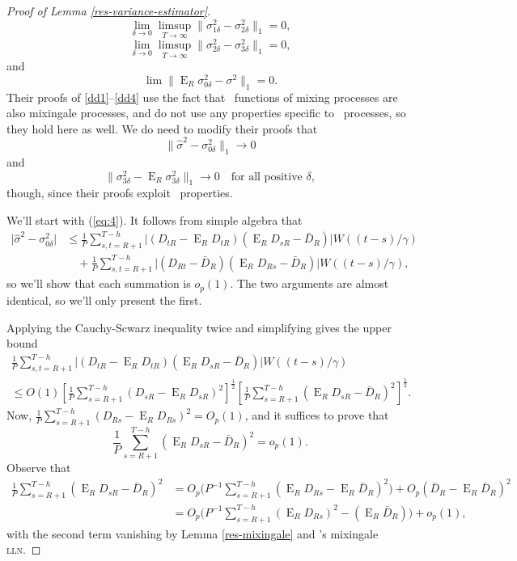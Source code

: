 \documentclass[11pt]{article}
\DeclareMathOperator{\E}{E}
\newcommand{\citepos}[1]{\citeauthor{#1}'s \citeyearpar{#1}}
\newcommand{\oosA}{\bar{D}_{R}}
\newcommand{\oosSum}[2]{\ensuremath{\sum_{#1=R+#2}^{T-\h}}}
\newcommand{\h}{h}
\newcommand{\vWeight}{W((t-s)/\gamma)}
\newcommand{\varianceTermI}{\ensuremath{\sigma_{0\delta}^2}}
\newcommand{\varianceTermII}{\ensuremath{\sigma_{1\delta}^2}}
\newcommand{\varianceTermIII}{\ensuremath{\sigma_{2\delta}^{2}}}
\newcommand{\varianceTermIV}{\ensuremath{\sigma_{3\delta}^{2}}}
\newcommand{\varianceDiffA}{\ensuremath{\frac1{P} \oosSum{s,t}{1}
    \lvert (D_{tR} - \E_R D_{tR})(\E_R D_{sR} - \oosA) \rvert
    \vWeight}}
\newcommand{\varianceDiffAi}{\ensuremath{\frac1P \oosSum{s}{1}(\E_R
    D_{sR} - \oosA )^2}}
\newcommand{\varianceDiffAii}{\ensuremath{\frac1P \oosSum{s}{1}
    (D_{sR} - \E_R D_{sR})^2}}
\newcommand{\lln}{\textsc{lln}}
\begin{document}
\begin{proof}[Proof of Lemma \ref{res-variance-estimator}]
\begin{equation}
\lim_{\delta\to0} \limsup_{T\to\infty} \lVert \varianceTermII - \varianceTermIII
\rVert_1 = 0,
\end{equation}
\begin{equation} \label{dd3}
\lim_{\delta\to0} \limsup_{T\to\infty} \lVert \varianceTermIII - \varianceTermIV
\rVert_1 = 0,  
\end{equation}
and
\begin{equation} \label{dd4}
\lim \lVert \E_R \varianceTermI - \sigma^2 \rVert_1 = 0.
\end{equation}
Their proofs of \eqref{dd1}--\eqref{dd4} use the fact that \ned\
functions of mixing processes are also mixingale processes, and do not
use any properties specific to \ned\ processes, so they hold here as
well.  We do need to modify their proofs that
\begin{equation}
  \label{eq:4} \lVert \hat{\sigma}^2 - \varianceTermI \rVert_1 \to 0
\end{equation}
and
\begin{equation}
  \label{eq:5} \lVert \varianceTermIV - \E_R \varianceTermIV \rVert_1
  \to 0 \quad \text{for all positive $\delta$},
\end{equation}
though, since their proofs exploit \ned\ properties.

We'll start with (\ref{eq:4}). It follows from simple algebra that
\begin{align*}
  \lvert \hat\sigma^2 - \varianceTermI \rvert & \leq  
  \varianceDiffA \\ & \quad + \frac1{P} \oosSum{s,t}{1} \lvert (D_{Rt} -
  \oosA)(\E_R D_{Rs} - \oosA) \rvert \vWeight,
\end{align*}
so we'll show that each summation is $o_p(1)$.  The two
arguments are almost identical, so we'll only present the first.

Applying the Cauchy-Scwarz inequality twice and simplifying gives the
upper bound
\begin{multline*}
\varianceDiffA \\ \leq O(1) [\varianceDiffAii]^{\frac12} [\varianceDiffAi]^{\frac12}.
\end{multline*}
Now,
$\frac1P \oosSum{s}{1}(D_{Rs} - \E_R D_{Rs})^2 = O_p(1)$, and it suffices to prove
that \[\varianceDiffAi = o_p(1).\]  Observe that
\begin{align*}
  \varianceDiffAi & = O_p\Big(P^{-1} \oosSum{s}{1}(\E_{R}D_{Rs} -
  \E_R\oosA)^2\Big) + O_p(\oosA - \E_R\oosA)^{2} \\
  &= O_p\Big(P^{-1} \oosSum{s}{1} (\E_RD_{Rs})^2 - (\E_R\oosA)\Big) +
  o_p(1),
\end{align*}
with the second term vanishing by Lemma \ref{res-mixingale} and
\citepos{Dav:93} mixingale \lln.


\end{proof}
\end{document}
